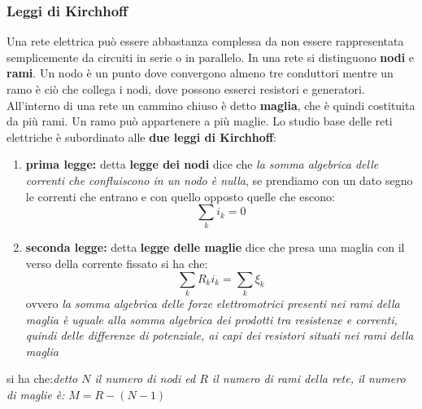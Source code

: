 \documentclass[a4paper,12pt, oneside]{book}
\begin{document}
\subsubsection{Leggi di Kirchhoff}
Una rete elettrica può essere abbastanza complessa da non essere rappresentata semplicemente da circuiti in serie o in parallelo. In una rete si distinguono \textbf{nodi} e \textbf{rami}. Un nodo è un punto dove convergono almeno tre conduttori mentre un ramo è ciò che collega i nodi, dove possono esserci resistori e generatori. All'interno di una rete un cammino chiuso è detto \textbf{maglia}, che è quindi costituita da più rami. Un ramo può appartenere a più maglie. Lo studio base delle reti elettriche è subordinato alle \textbf{due leggi di Kirchhoff}:
\begin{enumerate}
	\item \textbf{prima legge:} detta \textbf{legge dei nodi} dice che \textit{la somma algebrica delle correnti che confluiscono in un nodo è nulla}, se prendiamo con un dato segno le correnti che entrano e con quello opposto quelle che escono:
	      $$\sum_ki_k=0$$
	\item \textbf{seconda legge:} detta \textbf{legge delle maglie} dice che presa una maglia con il verso della corrente fissato si ha che:
	      $$\sum_kR_ki_k=\sum_k\xi_k$$
	      ovvero \textit{la somma algebrica delle forze elettromotrici presenti nei rami della maglia è uguale alla somma algebrica dei prodotti tra resistenze e correnti, quindi delle differenze di potenziale, ai capi dei resistori situati nei rami della maglia}
\end{enumerate}
si ha che:\textit{detto $N$ il numero di nodi ed $R$ il numero di rami della rete, il numero di maglie è:} $M=R-(N-1)$
\end{document}
